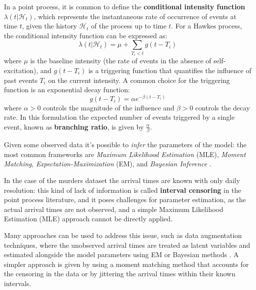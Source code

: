 In a point process, it is common to define the \textbf{conditional intensity function} $\lambda(t | \mathcal{H}_t)$, which represents the instantaneous rate of occurrence of events at time $t$, given the history $\mathcal{H}_t$ of the process up to time $t$. For a Hawkes process, the conditional intensity function can be expressed as:
\begin{equation}
  \lambda(t | \mathcal{H}_t) = \mu + \sum_{T_i < t} g(t - T_i)
\end{equation}
where $\mu$ is the baseline intensity (the rate of events in the absence of self-excitation), and $g(t - T_i)$ is a triggering function that quantifies the influence of past events $T_i$ on the current intensity. A common choice for the triggering function is an exponential decay function:
\begin{equation}
  g(t - T_i) = \alpha e^{-\beta (t - T_i)}
\end{equation}
where $\alpha > 0$ controls the magnitude of the influence and $\beta > 0$ controls the decay rate. In this formulation the expected number of events triggered by a single event, known as \textbf{branching ratio}, is given by $\frac{\alpha}{\beta}$.

Given some observed data it's possible to \textit{infer} the parameters of the model: the most common frameworks are \textit{Maximum Likelihood Estimation} (MLE), \textit{Moment Matching}, \textit{Expectation-Maximization} (EM), and \textit{Bayesian Inference} \cite{laubElementsHawkesProcesses2021}.

In the case of the murders dataset the arrival times are known with only daily resolution: this kind of lack of information is called \textbf{interval censoring} \cite{laubElementsHawkesProcesses2021} in the point process literature, and it poses challenges for parameter estimation, as the actual arrival times are not observed, and a simple Maximum Likelihood Estimation (MLE) approach cannot be directly applied.

Many approaches can be used to address this issue, such as data augmentation techniques, where the unobserved arrival times are treated as latent variables and estimated alongside the model parameters using EM \cite{shlomovichParameterEstimationMethod2022} or Bayesian methods \cite{derektuckerHandlingMissingData2019}. A simpler approach is given by using a moment matching method that accounts for the censoring in the data \cite{laubElementsHawkesProcesses2021} or by jittering the arrival times within their known intervals.

